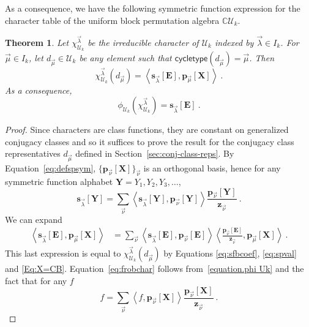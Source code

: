 \documentclass[10pt]{amsart}
\newtheorem{theorem}{Theorem}[section]
\theoremstyle{definition}
\theoremstyle{remark}
\newcommand{\CC}{\mathbb C}
\newcommand{\XXX}{\mathbf{X}}
\newcommand{\EEE}{\mathbf{E}}
\begin{document}
As a consequence, we have the following symmetric function expression for
the character table of the uniform block permutation algebra $\CC\mathcal{U}_k$.
\begin{theorem}
\label{conj:frobchar}
Let $\chi^{\vec{\lambda}}_{\mathcal{U}_k}$ be the irreducible character of $\mathcal{U}_k$ indexed by $\vec{\lambda}\in I_k$.
For $\vec{\mu} \in I_k$, let $d_{\vec{\mu}} \in \mathcal{U}_k$ be any element
such that $\mathsf{cycletype}(d_{\vec{\mu}}) = \vec{\mu}$. Then
\begin{equation}\label{eq:sfexpr}
\chi^{\vec{\lambda}}_{\mathcal{U}_k}(d_{\vec{\mu}}) = \left< \mathbf{s}_{\vec{\lambda}}[\EEE], \mathbf{p}_{\vec{\mu}}[\XXX] \right>~.
\end{equation}
As a consequence,
\begin{equation}
\label{eq:frobchar}
    \phi_{\mathcal{U}_k}( \chi^{\vec{\lambda}}_{\mathcal{U}_k} )
    = \mathbf{s}_{\vec{\lambda}}[\EEE]~.
\end{equation}
\end{theorem}

\begin{proof}
Since characters are class functions, they are constant on generalized
conjugacy classes and so it suffices to prove the result for the conjugacy
class representatives $d_{\vec{\mu}}$ defined in Section~\ref{sec:conj-class-reps}.
By Equation~\eqref{eq:defspsym}, $\{ \mathbf{p}_{\vec{\nu}}[\XXX] \}_{\vec{\nu}}$
is an orthogonal basis, hence for any symmetric function alphabet $\mathbf{Y} = Y_1, Y_2, Y_3, \ldots$,
$$\mathbf{s}_{\vec{\lambda}}[\mathbf{Y}] = \sum_{\vec{\nu}}
\left< \mathbf{s}_{\vec{\lambda}}[\mathbf{Y}], \mathbf{p}_{\vec{\nu}}[\mathbf{Y}]\right>
\frac{\mathbf{p}_{\vec{\nu}}[\mathbf{Y}]}{\mathbf{z}_{\vec{\nu}}}~.
$$
We can expand
\begin{align}\label{eq:sfversionXeqCB}
\left< \mathbf{s}_{\vec{\lambda}}[\EEE], \mathbf{p}_{\vec{\mu}}[\XXX] \right>&=
\sum_{\vec{\nu}} \left< \mathbf{s}_{\vec{\lambda}}[\EEE],
\mathbf{p}_{\vec{\nu}}[\EEE] \right>
\left< \frac{\mathbf{p}_{\vec{\nu}}[\EEE]}{\mathbf{z}_{\vec{\nu}}},\mathbf{p}_{\vec{\mu}}[\XXX] \right>~.
\end{align}
This last expression is equal to $\chi^{\vec{\lambda}}_{\mathcal{U}_k}(d_{\vec{\mu}})$
by Equations \eqref{eq:sfbcoef}, \eqref{eq:spval} and \eqref{Eq:X=CB}.
Equation~\eqref{eq:frobchar} follows from~\eqref{equation.phi Uk} and the fact that for any $f$
$$f = \sum_{\vec{\nu}} \left< f, \mathbf{p}_{\vec{\nu}}[\XXX]\right>
\frac{\mathbf{p}_{\vec{\nu}}[\XXX]}{\mathbf{z}_{\vec{\nu}}}~.
$$
\end{proof}
\end{document}
